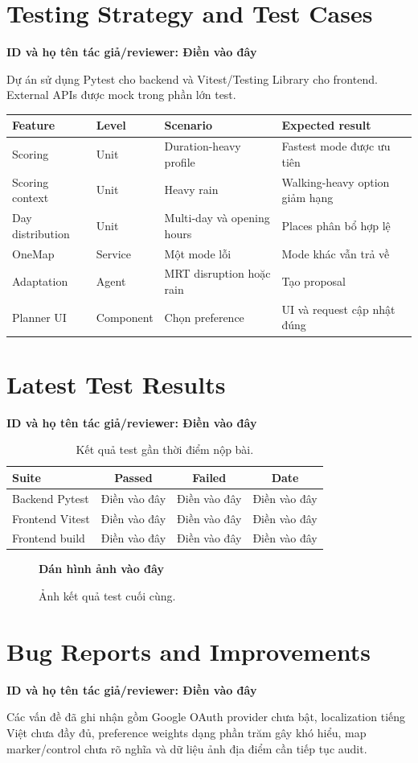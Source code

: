 \documentclass[12pt,a4paper,oneside]{report}
\newcommand{\tacgia}{%
  \begin{tcolorbox}[colback=blue!3,colframe=blue!25,boxrule=0.4pt,arc=1mm]
    \small\textbf{ID và họ tên tác giả/reviewer: Điền vào đây}
  \end{tcolorbox}
}
\newcommand{\danhinh}[1]{%
  \begin{figure}[H]
    \centering
    \begin{tcolorbox}[width=0.88\textwidth,height=5cm,valign=center,colback=gray!5,colframe=gray!45]
      \centering\Large\textbf{Dán hình ảnh vào đây}
    \end{tcolorbox}
    \caption{#1}
  \end{figure}
}
\begin{document}
\section{Testing Strategy and Test Cases}
\tacgia
Dự án sử dụng Pytest cho backend và Vitest/Testing Library cho frontend. External APIs được mock trong phần lớn test.
\begin{longtable}{p{3.3cm}p{3cm}p{5cm}p{4cm}}
\toprule
\textbf{Feature} & \textbf{Level} & \textbf{Scenario} & \textbf{Expected result} \\
\midrule
Scoring & Unit & Duration-heavy profile & Fastest mode được ưu tiên \\
Scoring context & Unit & Heavy rain & Walking-heavy option giảm hạng \\
Day distribution & Unit & Multi-day và opening hours & Places phân bổ hợp lệ \\
OneMap & Service & Một mode lỗi & Mode khác vẫn trả về \\
Adaptation & Agent & MRT disruption hoặc rain & Tạo proposal \\
Planner UI & Component & Chọn preference & UI và request cập nhật đúng \\
\bottomrule
\end{longtable}

\section{Latest Test Results}
\tacgia
\begin{table}[H]
\centering
\begin{tabular}{lccc}
\toprule
\textbf{Suite} & \textbf{Passed} & \textbf{Failed} & \textbf{Date} \\
\midrule
Backend Pytest & Điền vào đây & Điền vào đây & Điền vào đây \\
Frontend Vitest & Điền vào đây & Điền vào đây & Điền vào đây \\
Frontend build & Điền vào đây & Điền vào đây & Điền vào đây \\
\bottomrule
\end{tabular}
\caption{Kết quả test gần thời điểm nộp bài.}
\end{table}
\danhinh{Ảnh kết quả test cuối cùng.}

\section{Bug Reports and Improvements}
\tacgia
Các vấn đề đã ghi nhận gồm Google OAuth provider chưa bật, localization tiếng Việt chưa đầy đủ, preference weights dạng phần trăm gây khó hiểu, map marker/control chưa rõ nghĩa và dữ liệu ảnh địa điểm cần tiếp tục audit.
\end{document}
